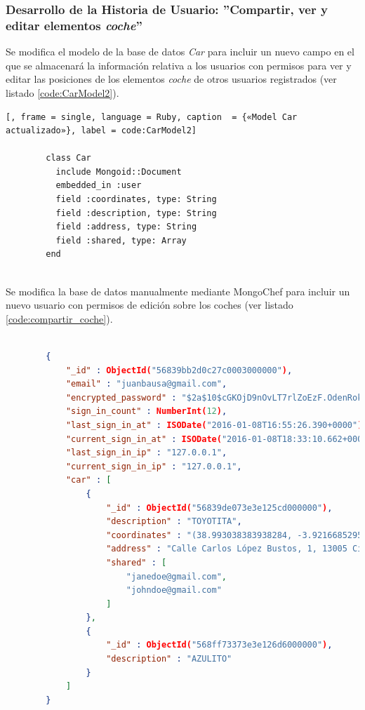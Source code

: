	\subsubsection{Desarrollo de la Historia de Usuario: ''Compartir, ver y editar elementos \textit{coche}'' }
	Se modifica el modelo de la base de datos \textit{Car} para incluir un nuevo campo en el que se almacenará la información relativa a los usuarios con permisos para ver y editar las posiciones de los elementos \textit{coche} de otros usuarios registrados (ver listado \ref{code:CarModel2}).
	
	\begin{lstlisting}[, frame = single, language = Ruby, caption  = {«Model Car actualizado»}, label = code:CarModel2]
		
		class Car
		  include Mongoid::Document
		  embedded_in :user
		  field :coordinates, type: String
		  field :description, type: String
		  field :address, type: String
		  field :shared, type: Array
		end
		
	\end{lstlisting}
	
	Se modifica la base de datos manualmente mediante MongoChef para incluir un nuevo usuario con permisos de edición sobre los coches (ver listado \ref{code:compartir_coche}).
	

	\begin{lstlisting}[frame = single, language = JSON, caption  = {«Documento con elemento \textit{coche} compartido»}, label = code:compartir_coche]
		
		{ 
		    "_id" : ObjectId("56839bb2d0c27c0003000000"), 
		    "email" : "juanbausa@gmail.com", 
		    "encrypted_password" : "$2a$10$cGKOjD9nOvLT7rlZoEzF.OdenRokm5aSxPynYyvp2tGCF1LmqCVtm", 
		    "sign_in_count" : NumberInt(12), 
		    "last_sign_in_at" : ISODate("2016-01-08T16:55:26.390+0000"), 
		    "current_sign_in_at" : ISODate("2016-01-08T18:33:10.662+0000"), 
		    "last_sign_in_ip" : "127.0.0.1", 
		    "current_sign_in_ip" : "127.0.0.1", 
		    "car" : [
		        {
		            "_id" : ObjectId("56839de073e3e125cd000000"), 
		            "description" : "TOYOTITA", 
		            "coordinates" : "(38.993038383938284, -3.921668529510498)", 
		            "address" : "Calle Carlos López Bustos, 1, 13005 Ciudad Real, Cdad. Real, España", 
		            "shared" : [
		                "janedoe@gmail.com", 
		                "johndoe@gmail.com"
		            ]
		        }, 
		        {
		            "_id" : ObjectId("568ff73373e3e126d6000000"), 
		            "description" : "AZULITO"
		        }
		    ]
		}
		
	\end{lstlisting}
	

